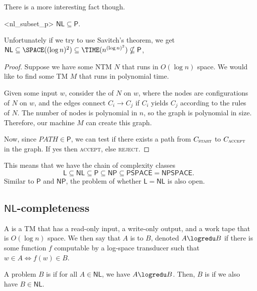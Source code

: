 \documentclass{standalone}
\begin{document}
There is a more interesting fact though.
\begin{proposition}<nl_subset_p>
	\(\mathsf{NL} \subseteq \mathsf{P}\).
\end{proposition}
Unfortunately if we try to use Savitch's theorem, we get \(\mathsf{NL} \subseteq \SPACE((\log n)^2) \subseteq \TIME(n^{(\log n)^2}) \nsubseteq \mathsf{P}\),
\begin{proof}
	Suppose we have some \textsf{NTM} \(N\) that runs in \(O(\log n)\) space. We would like to find some \textsf{TM} \(M\) that runs in polynomial time.

	Given some input \(w\), consider the  of \(N\) on \(w\), where the nodes are configurations of \(N\) on \(w\), and the edges connect \(C_i \to C_j\) if \(C_i\) yields \(C_j\) according to the rules of \(N\). The number of nodes is polynomial in \(n\), so the graph is polynomial in size. Therefore, our machine \(M\) can create this graph.

	Now, since \(\textit{PATH} \in \mathsf{P}\), we can test if there exists a path from \(C_{\textsc{start}}\) to \(C_{\textsc{accept}}\) in the graph. If yes then \textsc{accept}, else \textsc{reject}.
\end{proof}

This means that we have the chain of complexity classes
\[
	\mathsf{L} \subseteq \mathsf{NL} \subseteq \mathsf{P} \subseteq \mathsf{NP} \subseteq \mathsf{PSPACE} = \mathsf{NPSPACE}.
\]
Similar to \(\mathsf{P}\) and \(\mathsf{NP}\), the problem of whether \(\mathsf L = \mathsf{NL}\) is also open.

\subsection{\texorpdfstring{\(\mathsf{NL}\)}{NL}-completeness}
\begin{definition}
	A  is a \textsf{TM} that has a read-only input, a write-only output, and a work tape that is \(O(\log n)\) space. We then say that \(A\) is  to \(B\), denoted \(A \logredu B\) if there is some function \(f\) computable by a log-space transducer such that \(w \in A \iff f(w) \in B\).
\end{definition}

\begin{definition}
	A problem \(B\) is  if for all \(A \in \mathsf{NL}\), we have \(A \logredu B\). Then, \(B\) is  if we also have \(B \in \mathsf{NL}\).
\end{definition}
\end{document}
